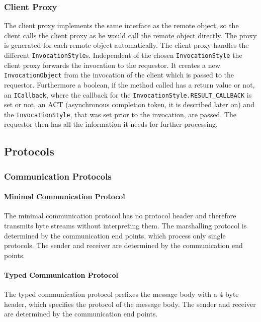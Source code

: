 \subsubsection{Client Proxy}
The client proxy implements the same interface as the remote object, so the client calls the client proxy as he would call the remote object directly. The proxy is generated for each remote object automatically. The client proxy handles the different \texttt{InvocationStyle}s. Independent of the chosen \texttt{InvocationStyle} the client proxy forwards the invocation to the requestor. It creates a new \texttt{InvocationObject} from the invocation of the client which is passed to the requestor. Furthermore a boolean, if the method called has a return value or not, an \texttt{ICallback}, where the callback for the \texttt{InvocationStyle.RESULT\_CALLBACK} is set or not, an ACT (asynchronous completion token, it is described later on) and the \texttt{InvocationStyle}, that was set prior to the invocation, are passed. The requestor then has all the information it needs for further processing.


\subsection{Protocols}

\subsubsection{Communication Protocols}

\paragraph{Minimal Communication Protocol}

The minimal communication protocol has no protocol header and therefore transmits byte streams without interpreting them.
The marshalling protocol is determined by the communication end points, which process only single protocols.
The sender and receiver are determined by the communication end points.

\paragraph{Typed Communication Protocol}

The typed communication protocol prefixes the message body with a 4 byte header, which specifies the protocol of the message body.
The sender and receiver are determined by the communication end points.

